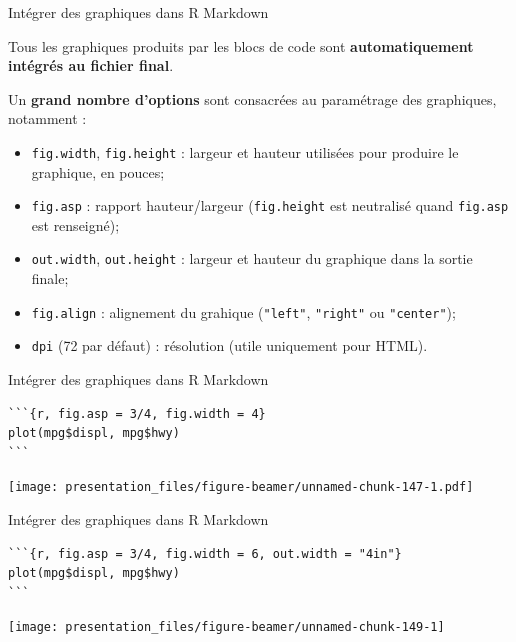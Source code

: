 \documentclass[12pt,handout,ignorenonframetext,]{beamer}
\providecommand{\tightlist}{%
  \setlength{\itemsep}{0pt}\setlength{\parskip}{0pt}}
\begin{document}
\begin{frame}[fragile]{Intégrer des graphiques dans R Markdown}

Tous les graphiques produits par les blocs de code sont
\textbf{automatiquement intégrés au fichier final}.

\pause Un \textbf{grand nombre d'options} sont consacrées au paramétrage
des graphiques, notamment :

\begin{itemize}
\tightlist
\item
  \texttt{fig.width}, \texttt{fig.height} : largeur et hauteur utilisées
  pour produire le graphique, en pouces;
\item
  \texttt{fig.asp} : rapport hauteur/largeur (\texttt{fig.height} est
  neutralisé quand \texttt{fig.asp} est renseigné);
\item
  \texttt{out.width}, \texttt{out.height} : largeur et hauteur du
  graphique dans la sortie finale;
\item
  \texttt{fig.align} : alignement du grahique (\texttt{"left"},
  \texttt{"right"} ou \texttt{"center"});
\item
  \texttt{dpi} (72 par défaut) : résolution (utile uniquement pour
  HTML).
\end{itemize}

\end{frame}

\begin{frame}[fragile]{Intégrer des graphiques dans R Markdown}

\footnotesize \center

\begin{verbatim}
```{r, fig.asp = 3/4, fig.width = 4}
plot(mpg$displ, mpg$hwy)
```
\end{verbatim}

\texttt{[image: presentation\_files/figure-beamer/unnamed-chunk-147-1.pdf]}

\end{frame}

\begin{frame}[fragile]{Intégrer des graphiques dans R Markdown}

\footnotesize \center

\begin{verbatim}
```{r, fig.asp = 3/4, fig.width = 6, out.width = "4in"}
plot(mpg$displ, mpg$hwy)
```
\end{verbatim}

\texttt{[image: presentation\_files/figure-beamer/unnamed-chunk-149-1]}

\end{frame}
\end{document}
